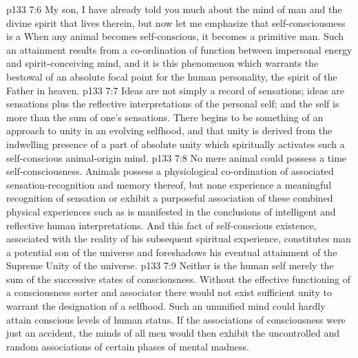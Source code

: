 \vs p133 7:6 \pc \textcolor{ubdarkred}{My son, I have already told you much about the mind of man and the divine spirit that lives therein, but now let me emphasize that self\hyp{}consciousness is a  When any animal becomes self\hyp{}conscious, it becomes a primitive man. Such an attainment results from a co\hyp{}ordination of function between impersonal energy and spirit\hyp{}conceiving mind, and it is this phenomenon which warrants the bestowal of an absolute focal point for the human personality, the spirit of the Father in heaven.}
\vs p133 7:7 \textcolor{ubdarkred}{Ideas are not simply a record of sensations; ideas are sensations plus the reflective interpretations of the personal self; and the self is more than the sum of one’s sensations. There begins to be something of an approach to unity in an evolving selfhood, and that unity is derived from the indwelling presence of a part of absolute unity which spiritually activates such a self\hyp{}conscious animal\hyp{}origin mind.}
\vs p133 7:8 \textcolor{ubdarkred}{No mere animal could possess a time self\hyp{}consciousness. Animals possess a physiological co\hyp{}ordination of associated sensation\hyp{}recognition and memory thereof, but none experience a meaningful recognition of sensation or exhibit a purposeful association of these combined physical experiences such as is manifested in the conclusions of intelligent and reflective human interpretations. And this fact of self\hyp{}conscious existence, associated with the reality of his subsequent spiritual experience, constitutes man a potential son of the universe and foreshadows his eventual attainment of the Supreme Unity of the universe.}
\vs p133 7:9 Neither is the human self merely the sum of the successive states of consciousness. Without the effective functioning of a consciousness sorter and associator there would not exist sufficient unity to warrant the designation of a selfhood. Such an ununified mind could hardly attain conscious levels of human status. If the associations of consciousness were just an accident, the minds of all men would then exhibit the uncontrolled and random associations of certain phases of mental madness.

